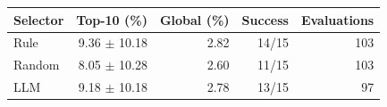 \begin{tabular}{lrrrr}
\toprule
Selector & Top-10 (\%) & Global (\%) & Success & Evaluations \\
\midrule
Rule & 9.36 $\pm$ 10.18 & 2.82 & 14/15 & 103 \\
Random & 8.05 $\pm$ 10.28 & 2.60 & 11/15 & 103 \\
LLM & 9.18 $\pm$ 10.18 & 2.78 & 13/15 & 97 \\
\bottomrule
\end{tabular}